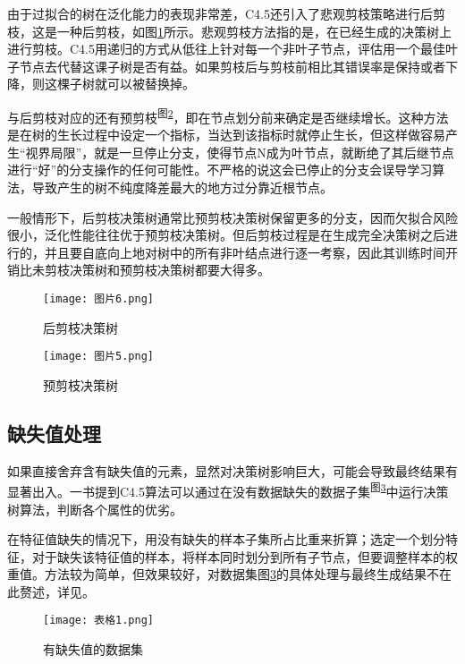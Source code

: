 \documentclass[fontset=windows]{article}
\begin{document}
由于过拟合的树在泛化能力的表现非常差，C4.5还引入了悲观剪枝策略进行后剪枝，这是一种后剪枝，如图\ref{fig:2}所示。悲观剪枝方法指的是，在已经生成的决策树上进行剪枝。C4.5用递归的方式从低往上针对每一个非叶子节点，评估用一个最佳叶子节点去代替这课子树是否有益。如果剪枝后与剪枝前相比其错误率是保持或者下降，则这棵子树就可以被替换掉。

与后剪枝对应的还有预剪枝\textsuperscript{图\ref{fig:6}}，即在节点划分前来确定是否继续增长。这种方法是在树的生长过程中设定一个指标，当达到该指标时就停止生长，但这样做容易产生“视界局限”，就是一旦停止分支，使得节点N成为叶节点，就断绝了其后继节点进行“好”的分支操作的任何可能性。不严格的说这会已停止的分支会误导学习算法，导致产生的树不纯度降差最大的地方过分靠近根节点。

一般情形下，后剪枝决策树通常比预剪枝决策树保留更多的分支，因而欠拟合风险很小，泛化性能往往优于预剪枝决策树。但后剪枝过程是在生成完全决策树之后进行的，并且要自底向上地对树中的所有非叶结点进行逐一考察，因此其训练时间开销比未剪枝决策树和预剪枝决策树都要大得多。

\begin{figure}[h]
\centering
\texttt{[image: 图片6.png]}
\caption{\label{fig:2}后剪枝决策树}
\end{figure}

\begin{figure}[h]
\centering
\texttt{[image: 图片5.png]}
\caption{\label{fig:6}预剪枝决策树}
\end{figure}

\subsection{缺失值处理}

如果直接舍弃含有缺失值的元素，显然对决策树影响巨大，可能会导致最终结果有显著出入。\cite[机器学习]{ref5}一书提到C4.5算法可以通过在没有数据缺失的数据子集\textsuperscript{图\ref{fig:5}}中运行决策树算法，判断各个属性的优劣。

在特征值缺失的情况下，用没有缺失的样本子集所占比重来折算；选定一个划分特征，对于缺失该特征值的样本，将样本同时划分到所有子节点，但要调整样本的权重值。方法较为简单，但效果较好，对数据集图\ref{fig:5}的具体处理与最终生成结果不在此赘述，详见\cite[机器学习]{ref5}。

\begin{figure}[h]
\centering
\caption{\label{fig:5}有缺失值的数据集}
\texttt{[image: 表格1.png]}
\end{figure}
\end{document}
